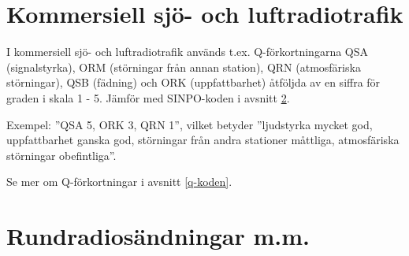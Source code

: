 \section{Kommersiell sjö- och luftradiotrafik}

I kommersiell sjö- och luftradiotrafik används t.ex. Q-förkortningarna
QSA (signalstyrka), ORM (störningar från annan station), QRN
(atmosfäriska störningar), QSB (fädning) och ORK (uppfattbarhet)
åtföljda av en siffra för graden i skala 1 - 5. Jämför med SINPO-koden
i avsnitt \ref{sinpo}.

Exempel:
''QSA 5, ORK 3, QRN 1'', vilket betyder
''ljudstyrka mycket god, uppfattbarhet ganska god, störningar från andra stationer
måttliga, atmosfäriska störningar obefintliga''.

Se mer om Q-förkortningar i avsnitt \ref{q-koden}.

\section{Rundradiosändningar m.m.}
\label{sinpo}

